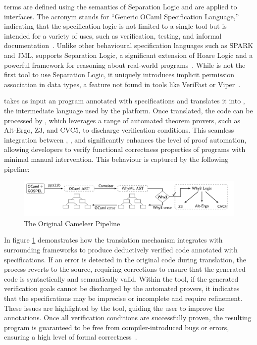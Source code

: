 \gospel terms are defined using the semantics of Separation Logic and are applied to \ocaml interfaces. The acronym \gospel stands 
for “Generic OCaml Specification Language,” indicating that the specification logic is not limited to a single tool but is intended 
for a variety of uses, such as verification, testing, and informal documentation~\cite{ChargueraudFLP19}. Unlike other behavioural 
specification languages such as \textsf{SPARK} and \textsf{JML}, \gospel supports Separation Logic, a significant extension of Hoare 
Logic and a powerful framework for reasoning about real-world programs~\cite{Reynolds02, OHearnRY01}. While \gospel is not the first 
tool to use Separation Logic, it uniquely introduces implicit permission association in data types, a feature not found in tools 
like \textsf{VeriFast} or \textsf{Viper}~\cite{ChargueraudFLP19}.

\cameleer takes as input an \ocaml program annotated with \gospel specifications and translates it into \whyml, the intermediate 
language used by the \whythree platform. Once translated, the code can be processed by \whythree, which leverages a range of automated 
theorem provers, such as Alt-Ergo, Z3, and CVC5, to discharge verification conditions. This seamless integration between \cameleer, 
\gospel, and \whythree significantly enhances the level of proof automation, allowing developers to verify functional correctness 
properties of \ocaml programs with minimal manual intervention. This behaviour is captured by the following pipeline:

\begin{figure}[H]
    \centering
    \includegraphics[width=\linewidth]{images/Cameleer_From_Paper.png}
    \caption{The Original Cameleer Pipeline~\cite{PereiraR20}}
    \label{fig:CameleerPipeline}
\end{figure}

In figure \ref{fig:CameleerPipeline} demonstrates how the translation mechanism integrates with surrounding frameworks to produce 
deductively verified \ocaml code annotated with \gospel specifications. If an error is detected in the original \ocaml code during 
translation, the process reverts to the source, requiring corrections to ensure that the generated \whyml code is syntactically and 
semantically valid. Within the \whythree tool, if the generated verification goals cannot be discharged by the automated provers, it indicates 
that the specifications may be imprecise or incomplete and require refinement. These issues are highlighted by the tool, guiding the 
user to improve the annotations. Once all verification conditions are successfully proven, the resulting program is guaranteed to 
be free from compiler-introduced bugs or errors, ensuring a high level of formal correctness~\cite{Filliatre11}.

